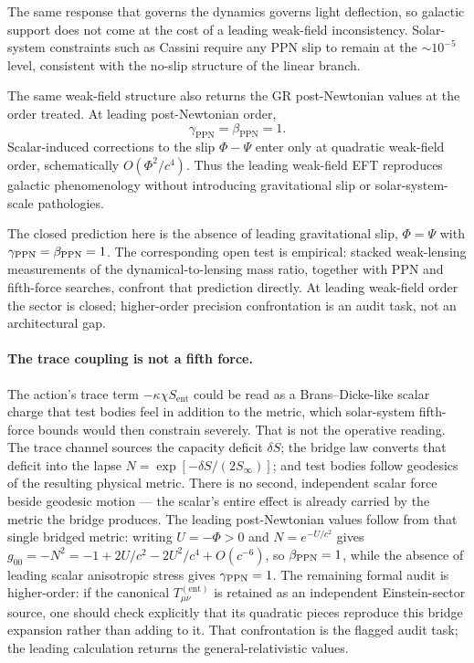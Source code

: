 \documentclass[11pt]{article}
\begin{document}
The same response that governs the dynamics governs light deflection, so galactic support does not come at the cost of a leading weak-field inconsistency. Solar-system constraints such as Cassini require any PPN slip to remain at the $\sim10^{-5}$ level, consistent with the no-slip structure of the linear branch.

The same weak-field structure also returns the GR post-Newtonian values at the order treated. At leading post-Newtonian order,
\[
\gamma_{\mathrm{PPN}}=\beta_{\mathrm{PPN}}=1.
\]
Scalar-induced corrections to the slip $\Phi-\Psi$ enter only at quadratic weak-field order, schematically $O(\Phi^2/c^4)$. Thus the leading weak-field EFT reproduces galactic phenomenology without introducing gravitational slip or solar-system-scale pathologies.

The closed prediction here is the absence of leading gravitational slip, $\Phi=\Psi$ with $\gamma_{\rm PPN}=\beta_{\rm PPN}=1$. The corresponding open test is empirical: stacked weak-lensing measurements of the dynamical-to-lensing mass ratio, together with PPN and fifth-force searches, confront that prediction directly. At leading weak-field order the sector is closed; higher-order precision confrontation is an audit task, not an architectural gap.

\paragraph{The trace coupling is not a fifth force.}
The action's trace term $-\kappa\chi S_{\mathrm{ent}}$ could be read as a Brans--Dicke-like scalar charge that test bodies feel in addition to the metric, which solar-system fifth-force bounds would then constrain severely. That is not the operative reading. The trace channel sources the capacity deficit $\delta S$; the bridge law converts that deficit into the lapse $N=\exp[-\delta S/(2S_\infty)]$; and test bodies follow geodesics of the resulting physical metric. There is no second, independent scalar force beside geodesic motion --- the scalar's entire effect is already carried by the metric the bridge produces. The leading post-Newtonian values follow from that single bridged metric: writing $U=-\Phi>0$ and $N=e^{-U/c^2}$ gives $g_{00}=-N^2=-1+2U/c^2-2U^2/c^4+O(c^{-6})$, so $\beta_{\rm PPN}=1$, while the absence of leading scalar anisotropic stress gives $\gamma_{\rm PPN}=1$. The remaining formal audit is higher-order: if the canonical $T^{(\mathrm{ent})}_{\mu\nu}$ is retained as an independent Einstein-sector source, one should check explicitly that its quadratic pieces reproduce this bridge expansion rather than adding to it. That confrontation is the flagged audit task; the leading calculation returns the general-relativistic values.
\end{document}
